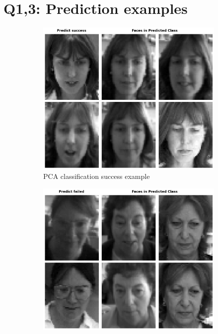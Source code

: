 \section{Q1,3: Prediction examples}
\label{subsec:Q13_eg}
\begin{figure}[htbp]
	\centering
        \begin{subfigure}[t]{0.4\linewidth}
        \centering
        \includegraphics[width=\linewidth]{image/q1_success.png}
	\caption{PCA classification success example}
	\label{fig:q3_success}
        \end{subfigure}
    \quad
        \begin{subfigure}[t]{0.4\linewidth}
        \centering
        \includegraphics[width=\linewidth]{image/q1_fail.png}

\end{subfigure}
\end{figure}
